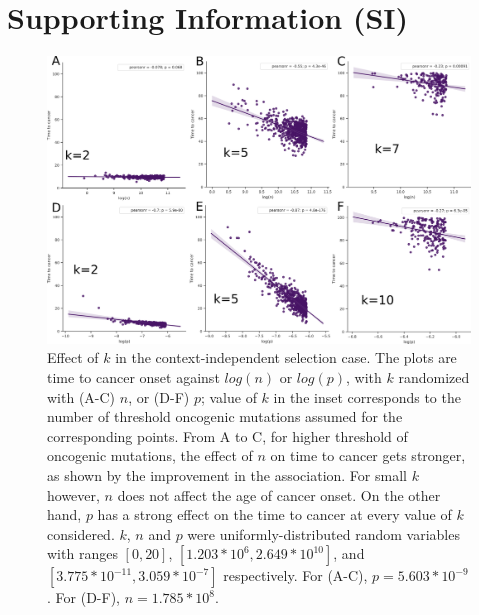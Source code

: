 \documentclass[9pt,twocolumn,twoside]{pnas-new}
\begin{document}
\section*{Supporting Information (SI)}
\begin{figure}[tbhp]
	\centering
	\includegraphics[width=.8\linewidth]{fig5.png}
	\caption{Effect of $k$ in the context-independent selection case. The plots are time to cancer onset against $log(n)$ or $log(p)$, with $k$ randomized with (A-C) $n$, or (D-F) $p$; value of $k$ in the inset corresponds to the number of threshold oncogenic mutations assumed for the corresponding points. From A to C, for higher threshold of oncogenic mutations, the effect of $n$ on time to cancer gets stronger, as shown by the improvement in the association. For small $k$ however, $n$ does not affect the age of cancer onset. On the other hand, $p$ has a strong effect on the time to cancer at every value of $k$ considered. $k$, $n$ and $p$ were uniformly-distributed random variables with ranges $[0, 20]$, $[1.203*10^{6}, 2.649*10^{10}]$, and $[3.775*10^{-11}, 3.059*10^{-7}]$ respectively. For (A-C), $p=5.603*10^{-9}$. For (D-F), $n=1.785*10^{8}$.}
	\label{figS1}
\end{figure}
\end{document}
